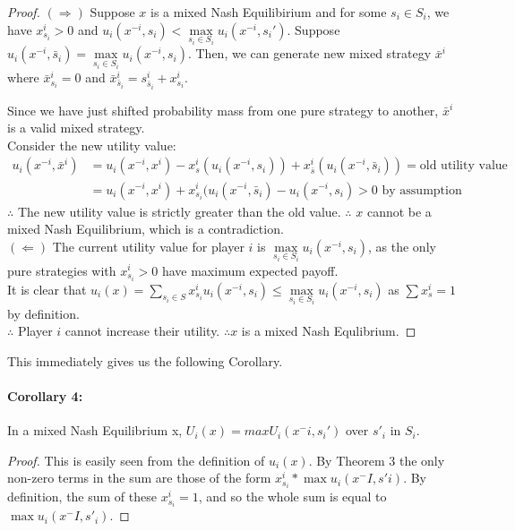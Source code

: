 \documentclass[12pt]{article}
\begin{document}
\begin{proof}
$(\Rightarrow)$ Suppose $x$ is a mixed Nash Equilibirium and for some $s_i \in S_i$, we have $x^i_{s_i} > 0$ and $u_i(x^{-i},s_i) < \max\limits_{s_i \in S_i} u_i(x^{-i},s_i')$. Suppose $u_i(x^{-i},\bar{s}_i) = \max\limits_{s_i \in S_i} u_i(x^{-i},s_i)$. Then, we can generate new mixed strategy $\bar{x}^i$ where $\bar{x}^i_{s_i} = 0$ and $\bar{x}^i_{\bar{s}_i} = s^i_{\bar{s}_i} + x^i_{s_i}$.

Since we have just shifted probability mass from one pure strategy to another, $\bar{x}^i$ is a valid mixed strategy.\\

Consider the new utility value:\\
$\begin{array}{rl}
u_i(x^{-i},\bar{x}^i) & = u_i(x^{-i},x^i) - x^i_s( u_i(x^{-i},s_i)) + x^i_{\bar{s}}(u_i(x^{-i},\bar{s}_i)) = \text{old utility value}\\
& = u_i(x^{-i},x^i)+ x^i_{s_i}(u_i(x^{-i},\bar{s}_i) - u_i(x^{-i},s_i) > 0 \text{ by assumption}
\end{array}$\\

$\therefore$ The new utility value is strictly greater than the old value. $\therefore$ $x$ cannot be a mixed Nash Equilibrium, which is a contradiction.\\

$(\Leftarrow)$ The current utility value for player $i$ is $\max\limits_{s_i \in S_i} u_i(x^{-i}, s_i)$, as the only pure strategies with $x^i_{s_i} > 0$ have maximum expected payoff.\\

It is clear that $u_i(x) = \sum\limits_{s_i \in S} x^i_{s_i} u_i(x^{-i},s_i) \leq \max\limits_{s_i \in S_i} u_i(x^{-i},s_i)$ as $\sum x^i_s = 1$ by definition.\\

$\therefore$ Player $i$ cannot increase their utility. $\therefore x$ is a mixed Nash Equlibrium.
\end{proof}

This immediately gives us the following Corollary.
\paragraph{Corollary 4:} In a mixed Nash Equilibrium x, $U_i(x) = max U_i(x^-i, s_i')$ over $s'_i$ in $S_i$.

\begin{proof}
This is easily seen from the definition of $u_i(x)$. By Theorem 3 the only non-zero terms in the sum are those of the form $x^i_{s_i} * \max u_i(x^-I, s'i)$. By definition, the sum of these $x^i_{s_i} = 1$, and so the whole sum is equal to $\max u_i(x^-I, s'_i)$.
\end{proof}
\end{document}
